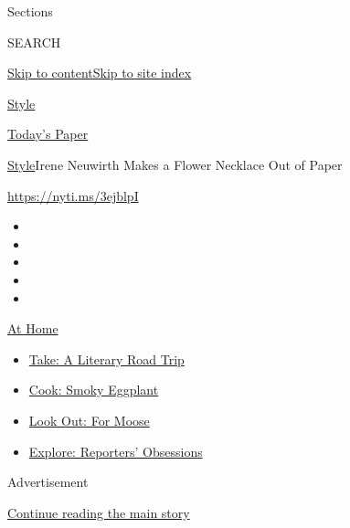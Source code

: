 Sections

SEARCH

\protect\hyperlink{site-content}{Skip to
content}\protect\hyperlink{site-index}{Skip to site index}

\href{https://www.nytimes.com/section/style}{Style}

\href{https://myaccount.nytimes.com/auth/login?response_type=cookie\&client_id=vi}{}

\href{https://www.nytimes.com/section/todayspaper}{Today's Paper}

\href{/section/style}{Style}\textbar{}Irene Neuwirth Makes a Flower
Necklace Out of Paper

\url{https://nyti.ms/3ejblpI}

\begin{itemize}
\item
\item
\item
\item
\item
\end{itemize}

\href{https://www.nytimes.com/spotlight/at-home?action=click\&pgtype=Article\&state=default\&region=TOP_BANNER\&context=at_home_menu}{At
Home}

\begin{itemize}
\tightlist
\item
  \href{https://www.nytimes.com/2020/07/28/books/time-for-a-literary-road-trip.html?action=click\&pgtype=Article\&state=default\&region=TOP_BANNER\&context=at_home_menu}{Take:
  A Literary Road Trip}
\item
  \href{https://www.nytimes.com/2020/07/29/magazine/bored-with-your-home-cooking-some-smoky-eggplant-will-fix-that.html?action=click\&pgtype=Article\&state=default\&region=TOP_BANNER\&context=at_home_menu}{Cook:
  Smoky Eggplant}
\item
  \href{https://www.nytimes.com/2020/07/27/travel/moose-michigan-isle-royale.html?action=click\&pgtype=Article\&state=default\&region=TOP_BANNER\&context=at_home_menu}{Look
  Out: For Moose}
\item
  \href{https://www.nytimes.com/interactive/2020/at-home/even-more-reporters-editors-diaries-lists-recommendations.html?action=click\&pgtype=Article\&state=default\&region=TOP_BANNER\&context=at_home_menu}{Explore:
  Reporters' Obsessions}
\end{itemize}

Advertisement

\protect\hyperlink{after-top}{Continue reading the main story}

